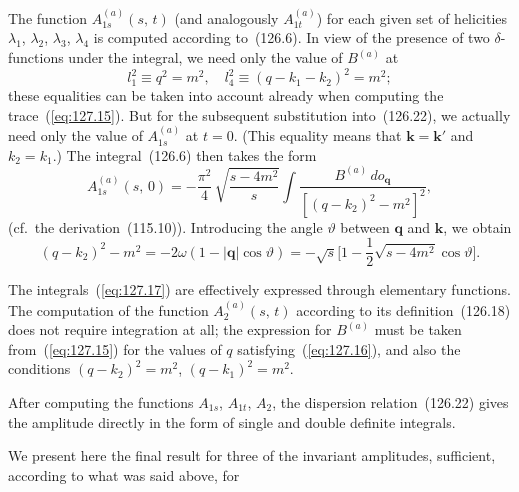 The function $A_{1s}^{(a)}(s,\,t)$ (and analogously $A_{1t}^{(a)}$) for each given set of helicities $\lambda_1$, $\lambda_2$, $\lambda_3$, $\lambda_4$ is computed according to~(126.6). In view of the presence of two $\delta$-functions under the integral, we need only the value of $B^{(a)}$ at
\begin{equation}
l_1^2 \equiv q^2 = m^2, \quad l_4^2 \equiv (q - k_1 - k_2)^2 = m^2;
\label{eq:127.16}
\end{equation}
these equalities can be taken into account already when computing the trace~(\ref{eq:127.15}). But for the subsequent substitution into~(126.22), we actually need only the value of $A_{1s}^{(a)}$ at $t = 0$. (This equality means that $\mathbf{k} = \mathbf{k}'$ and $k_2 = k_1$.) The integral~(126.6) then takes the form
\begin{equation}
A_{1s}^{(a)}(s,\,0) = -\frac{\pi^2}{4}\,\sqrt{\frac{s - 4m^2}{s}}\int\frac{B^{(a)}\,d o_{\mathbf{q}}}{[(q - k_2)^2 - m^2]^2},
\label{eq:127.17}
\end{equation}
(cf.\ the derivation~(115.10)). Introducing the angle $\vartheta$ between $\mathbf{q}$ and $\mathbf{k}$, we obtain
\[
(q - k_2)^2 - m^2 = -2\omega(1 - |\mathbf{q}|\cos\vartheta) = -\sqrt{s}\biggl[1 - \frac{1}{2}\sqrt{s - 4m^2}\cos\vartheta\biggr].
\]

The integrals~(\ref{eq:127.17}) are effectively expressed through elementary functions. The computation of the function $A_2^{(a)}(s,\,t)$ according to its definition~(126.18) does not require integration at all; the expression for $B^{(a)}$ must be taken from~(\ref{eq:127.15}) for the values of $q$ satisfying~(\ref{eq:127.16}), and also the conditions $(q - k_2)^2 = m^2$, $(q - k_1)^2 = m^2$.

After computing the functions $A_{1s}$, $A_{1t}$, $A_2$, the dispersion relation~(126.22) gives the amplitude directly in the form of single and double definite integrals.

We present here the final result for three of the invariant amplitudes, sufficient, according to what was said above, for


